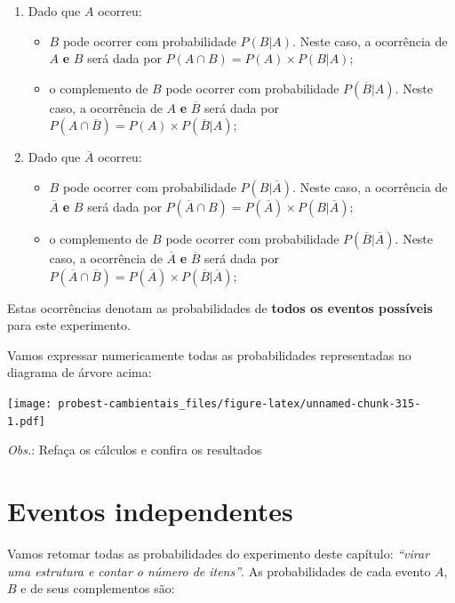 \documentclass[
]{book}
\providecommand{\tightlist}{%
  \setlength{\itemsep}{0pt}\setlength{\parskip}{0pt}}
\begin{document}
\begin{enumerate}
\def\labelenumi{\arabic{enumi}.}
\tightlist
\item
  Dado que \(A\) ocorreu:

  \begin{itemize}
  \tightlist
  \item
    \(B\) pode ocorrer com probabilidade \(P(B|A)\). Neste caso, a ocorrência de \(A\) \textbf{e} \(B\) será dada por \(P(A \cap B) = P(A) \times P(B|A)\);
  \item
    o complemento de \(B\) pode ocorrer com probabilidade \(P(\overline{B}|A)\). Neste caso, a ocorrência de \(A\) \textbf{e} \(\overline{B}\) será dada por \(P(A \cap \overline{B}) = P(A) \times P(\overline{B}|A)\);
  \end{itemize}
\item
  Dado que \(\overline{A}\) ocorreu:

  \begin{itemize}
  \tightlist
  \item
    \(B\) pode ocorrer com probabilidade \(P(B|\overline{A})\). Neste caso, a ocorrência de \(\overline{A}\) \textbf{e} \(B\) será dada por \(P(\overline{A} \cap B) = P(\overline{A}) \times P(B|\overline{A})\);
  \item
    o complemento de \(B\) pode ocorrer com probabilidade \(P(\overline{B}|\overline{A})\). Neste caso, a ocorrência de \(\overline{A}\) \textbf{e} \(\overline{B}\) será dada por \(P(\overline{A} \cap \overline{B}) = P(\overline{A}) \times P(\overline{B}|\overline{A})\);
  \end{itemize}
\end{enumerate}

Estas ocorrências denotam as probabilidades de \textbf{todos os eventos possíveis} para este experimento.

Vamos expressar numericamente todas as probabilidades representadas no diagrama de árvore acima:

\texttt{[image: probest-cambientais\_files/figure-latex/unnamed-chunk-315-1.pdf]}

\emph{Obs.}: Refaça os cálculos e confira os resultados

\hypertarget{eventos-independentes}{%
\section{Eventos independentes}\label{eventos-independentes}}

Vamos retomar todas as probabilidades do experimento deste capítulo: \emph{``virar uma estrutura e contar o número de itens''}. As probabilidades de cada evento \(A\), \(B\) e de seus complementos são:
\end{document}

